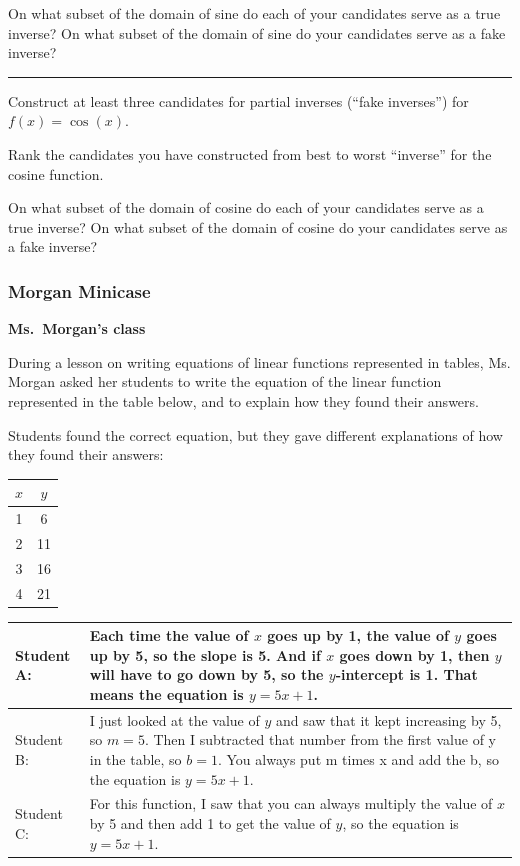 \documentclass[11pt]{article}
\newcommand{\handout}{\subsubsection}
\theoremstyle{definition}
\begin{document}
On what subset of the domain of sine do each of your candidates serve as a true inverse? On what subset of the domain of sine do your candidates serve as a fake inverse? 

\vspace*{2pt} \hrule \vspace*{2pt}
Construct at least three candidates for partial inverses (``fake inverses'') for $f(x)=\cos(x)$. 

Rank the candidates you have constructed from best to worst ``inverse'' for the cosine function.

On what subset of the domain of cosine do each of your candidates serve as a true inverse? On what subset of the domain of cosine do your candidates serve as a fake inverse? 

\newpage
\handout{Morgan Minicase}

\begin{mdframed}
\begin{center} {\bf Ms.~Morgan's class} \end{center}
\begin{minipage}{5in}\raggedright \parskip4pt
During a lesson on writing equations of linear functions represented in tables, Ms. Morgan
asked her students to write the equation of the linear function represented in the table below,
and to explain how they found their answers.

Students found the correct equation, but they gave different explanations of how they found
their answers:
\end{minipage}
\begin{minipage}{1in}
\vspace*{-20pt}
\begin{center}\begin{tabular}{c|c}
$x$ & $y$ \\ \hline
1 & 6  \\ 
2 & 11 \\ 
3 & 16 \\
4 & 21 
\end{tabular}
\end{center}
\end{minipage}

\begin{tabular}{L{0.75in}L{5in}}
\hline
Student A: & Each time the value of $x$ goes up by 1, the value of $y$ goes up by 5, so the
slope is 5. And if $x$ goes down by 1, then $y$ will have to go down by 5, so
the $y$-intercept is 1. That means the equation is $y = 5x + 1$.
\\ \hline
Student B: &  I just looked at the value of $y$ and saw that it kept increasing by 5, so $m =
5$. Then I subtracted that number from the first value
of y in the table, so $b = 1$. You always put m times x and add the b, so the
equation is $y = 5x + 1$.
\\ \hline
Student C: & For this function, I saw that you can always multiply the value of $x$ by 5
and then add 1 to get the value of $y$, so the equation is $y = 5x + 1.$
\\ \hline
\end{tabular}
\end{mdframed}
\end{document}
